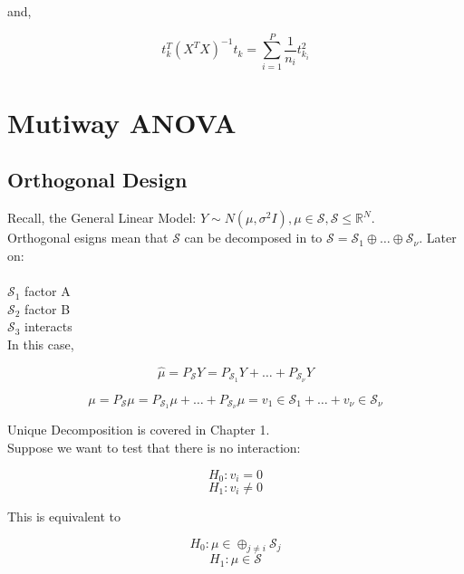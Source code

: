 \documentclass[11pt,fleqn]{book} %
\begin{document}
and, 

		$$t^T_k(X^T X)^{-1} t_k = \displaystyle \sum^P_{i=1} \frac{1}{n_i}t^2_{k_i} $$










\chapter{Mutiway ANOVA}

\section{Orthogonal Design}


Recall, the General Linear Model: $Y \sim N(\mu, \sigma^2 I), \mu \in \mathcal{S}, \mathcal{S} \leq \mathbb{R}^N$. \\


Orthogonal esigns mean that $\mathcal{S}$ can be decomposed in to $\mathcal{S} = \mathcal{S}_1 \oplus \dots \oplus \mathcal{S}_\nu$. Later on:\\
\\
$\mathcal{S}_1$ factor A\\
$\mathcal{S}_2$ factor B\\
$\mathcal{S}_3$ interacts\\

In this case, 

	$$\hat{\mu} = P_{\mathcal{S}} Y = P_{\mathcal{S}_1} Y + \dots + P_{\mathcal{S}_\nu} Y$$

	$$ \mu = P_{\mathcal{S}} \mu = P_{\mathcal{S}_1} \mu + \dots + P_{\mathcal{S}_\nu} \mu = v_1 \in \mathcal{S}_1 + \dots + v_\nu \in \mathcal{S}_\nu $$


Unique Decomposition is covered in Chapter 1. \\

Suppose we want to test that there is no interaction: 

		$$H_0: v_i = 0 $$
		$$H_1: v_i \neq 0 $$

This is equivalent to 

		$$H_0: \mu \in \oplus_{j \neq i} \mathcal{S}_j$$
		$$H_1: \mu \in \mathcal{S} $$
\end{document}
